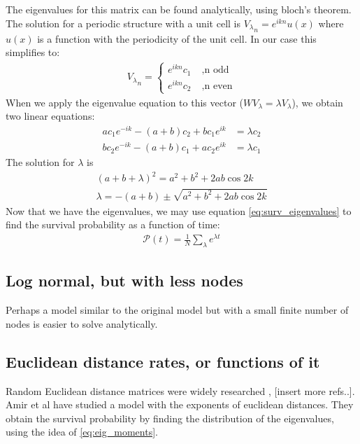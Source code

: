 \documentclass[onecolumn,fleqn]{revtex4}
\begin{document}
The eigenvalues for this matrix can be found analytically, using bloch's theorem. The solution for a periodic structure with a unit cell is ${V_\lambda}_n = e^{ikn} u(x)$ where $u(x)$ is a function with the periodicity of the unit cell. In our case this simplifies to:
\begin{align}
{V_\lambda}_n = \begin{cases}e^{ikn} c_1 \; &, \text{n odd} \\ e^{ikn} c_2 \; &, \text{n even} \end{cases}
\end{align}
When we apply the eigenvalue equation to this vector ($WV_\lambda = \lambda V_\lambda$), we obtain two linear equations:
\begin{align}
ac_1e^{-ik}   -(a+b)c_2 +bc_1e^{ik} &= \lambda c_2 \\
bc_2e^{-ik}   -(a+b)c_1 +ac_2e^{ik} &= \lambda c_1 
\end{align}
The solution for $\lambda$ is
\begin{align}
(a+b+\lambda)^2 = a^2+b^2+2ab\cos 2k \\
\lambda = -(a + b) \pm \sqrt{a^2+b^2+2ab\cos 2k}  \label{eq:abab_eigenvals}
\end{align}
Now that we have the eigenvalues, we may use equation \ref{eq:surv_eigenvalues} to find the survival probability as a function of time:
\begin{align}
\mathcal{P}(t) =\frac{1}{N}\sum_\lambda e^{\lambda t} 
\end{align}

\subsection{Log normal, but with less nodes}
Perhaps a model similar to the original model but with a small finite number of nodes is easier to solve analytically.


\subsection{Euclidean distance rates, or functions of it}
Random Euclidean distance matrices were widely researched \cite{Mezard:1999:NPB}, [insert more refs..]. Amir et al \cite{Amir:2010:PRL} have studied a model with the exponents of euclidean distances. They obtain the survival probability by finding the distribution of the eigenvalues, using the idea of \ref{eq:eig_moments}. 
\end{document}
